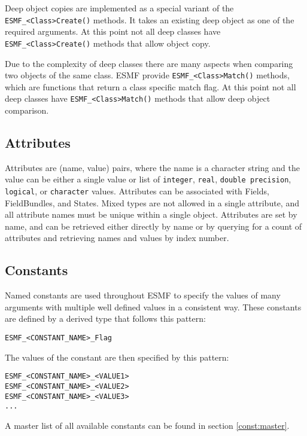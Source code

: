 \begin{sloppypar}
Deep object copies are implemented as a special variant of the
{\tt ESMF\_<Class>Create()} methods. It takes an existing deep object as
one of the required arguments. At this point not all deep classes have
{\tt ESMF\_<Class>Create()} methods that allow object copy.
\end{sloppypar}

Due to the complexity of deep classes there are many aspects when comparing two
objects of the same class. ESMF provide {\tt ESMF\_<Class>Match()} methods,
which are functions that return a class specific match flag. At this point not
all deep classes have {\tt ESMF\_<Class>Match()} methods that allow deep object
comparison.

\subsection{Attributes}

Attributes are (name, value) pairs, where
the name is a character string and the value can be either a single
value or list of {\tt integer}, {\tt real}, {\tt double precision},
{\tt logical}, or {\tt character} values.
Attributes can be associated with Fields, FieldBundles, and States. 
Mixed types are not allowed in a single attribute, and all attribute
names must be unique within a single object.    Attributes are set
by name, and can be retrieved either directly by name or by querying
for a count of attributes and retrieving names and values
by index number.

\subsection{Constants}

Named constants are used throughout ESMF to specify the values of many 
arguments with multiple well defined values in a consistent way.  These 
constants are defined by a derived type that follows this pattern:

\begin{verbatim}
ESMF_<CONSTANT_NAME>_Flag
\end{verbatim}

The values of the constant are then specified by this pattern:

\begin{verbatim}
ESMF_<CONSTANT_NAME>_<VALUE1>
ESMF_<CONSTANT_NAME>_<VALUE2>
ESMF_<CONSTANT_NAME>_<VALUE3>
...
\end{verbatim}

A master list of all available constants can be found in section 
\ref{const:master}.
